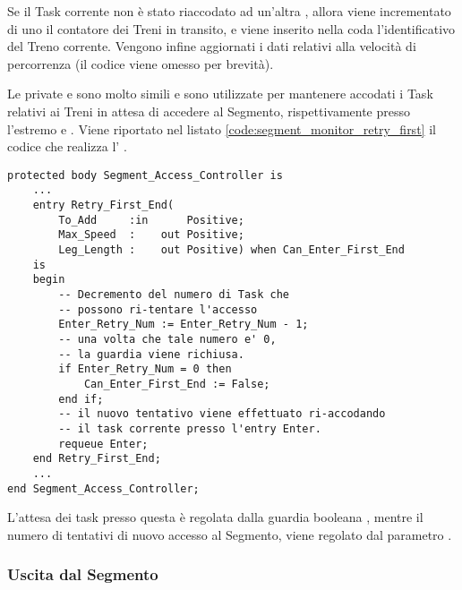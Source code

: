 Se il Task corrente non è stato riaccodato ad un'altra , allora viene incrementato di uno il contatore dei Treni in transito, e viene inserito nella coda  l'identificativo del Treno corrente. Vengono infine aggiornati i dati relativi alla velocità di percorrenza (il codice viene omesso per brevità).

	Le  private  e  sono molto simili e sono utilizzate per mantenere accodati i Task relativi ai Treni in attesa di accedere al Segmento, rispettivamente presso l'estremo  e . Viene riportato nel listato \ref{code:segment_monitor_retry_first} il codice che realizza l' .
	
\begin{lstlisting}[caption=\small{\ii{entry} utilizzata per accodare i Task che rappresentano Treni in attesa di accesso presso il primo estremo del Segmento.},label=code:segment_monitor_retry_first]
protected body Segment_Access_Controller is
	...
	entry Retry_First_End(
		To_Add     :in		Positive;
		Max_Speed  : 	out Positive;
		Leg_Length :	out	Positive) when Can_Enter_First_End
	is
	begin
		-- Decremento del numero di Task che 
		-- possono ri-tentare l'accesso
		Enter_Retry_Num := Enter_Retry_Num - 1;
		-- una volta che tale numero e' 0, 
		-- la guardia viene richiusa.
		if Enter_Retry_Num = 0 then
			Can_Enter_First_End := False;
		end if;
		-- il nuovo tentativo viene effettuato ri-accodando
		-- il task corrente presso l'entry Enter.
		requeue Enter;
	end Retry_First_End;
	...
end Segment_Access_Controller;
\end{lstlisting}
	
	L'attesa dei task presso questa  è regolata dalla guardia booleana , mentre il numero di tentativi di nuovo accesso al Segmento, viene regolato dal parametro .
	
	\subsubsection{Uscita dal Segmento}
	
